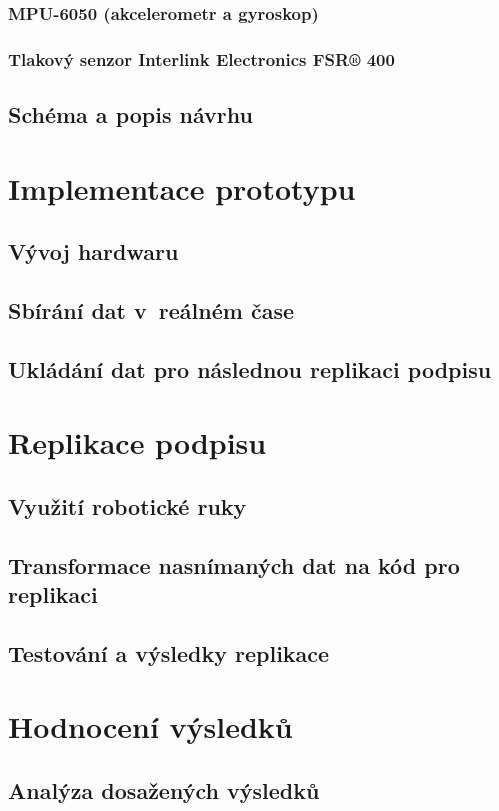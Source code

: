 \subsection{MPU-6050 (akcelerometr a gyroskop)}
\subsection{Tlakový senzor Interlink Electronics FSR® 400}
\section{Schéma a popis návrhu}

\chapter{Implementace prototypu}
\section{Vývoj hardwaru}
\section{Sbírání dat v~reálném čase}
\section{Ukládání dat pro následnou replikaci podpisu}

\chapter{Replikace podpisu}
\section{Využití robotické ruky}
\section{Transformace nasnímaných dat na kód pro replikaci}
\section{Testování a výsledky replikace}

\chapter{Hodnocení výsledků}
\section{Analýza dosažených výsledků}
